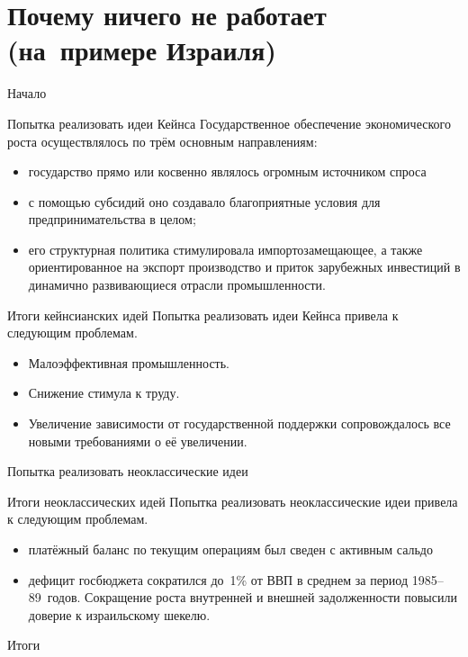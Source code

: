\documentclass{beamer}
\begin{document}
	\section{Почему ничего не работает (на~примере Израиля)}

	\begin{frame}{Начало}
	
	\end{frame}
	
	\begin{frame}{Попытка реализовать идеи Кейнса}
		Государственное обеспечение экономического роста осуществлялось по трём основным направлениям:
		\begin{itemize}
		\item государство прямо или косвенно являлось огромным источником спроса
		\item с помощью субсидий оно создавало благоприятные условия для предпринимательства в целом;
		\item его структурная политика стимулировала импортозамещающее, а также ориентированное на экспорт производство и приток зарубежных инвестиций в динамично развивающиеся отрасли промышленности.
		\end{itemize}
	\end{frame}

	\begin{frame}{Итоги кейнсианских идей}
		Попытка реализовать идеи Кейнса привела к следующим проблемам.
		\begin{itemize}
			\item Малоэффективная промышленность.
			\item Снижение стимула к труду.
			\item Увеличение зависимости от государственной поддержки сопровождалось все новыми требованиями о её увеличении.
		\end{itemize}
	\end{frame}

	\begin{frame}{Попытка реализовать неоклассические идеи}
		
	\end{frame}
	
	\begin{frame}{Итоги неоклассических идей}
		Попытка реализовать неоклассические идеи привела к следующим проблемам.
		\begin{itemize}
			\item платёжный баланс по текущим операциям был сведен с активным сальдо
			\item дефицит госбюджета сократился до~1\% от ВВП в среднем за период 1985--89~годов.
			Сокращение роста внутренней и внешней задолженности повысили доверие к израильскому шекелю.
		\end{itemize}
	\end{frame}
	
	\begin{frame}{Итоги}
	
	\end{frame}
	
\end{document}
